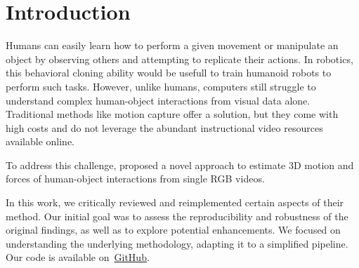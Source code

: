 \section{Introduction}
\label{sec:intro}

Humans can easily learn how to perform a given movement or manipulate an object by observing others and attempting to replicate their actions. 
In robotics, this behavioral cloning ability would be usefull to train humanoid robots to perform such tasks. 
However, unlike humans, computers still struggle to understand complex human-object interactions from visual data alone. 
Traditional methods like motion capture offer a solution, but they come with high costs and do not leverage the abundant instructional video 
resources available online.

To address this challenge, \citet{li2019estimating} proposed a novel approach to estimate 3D motion and forces of human-object interactions 
from single RGB videos. 

In this work, we critically reviewed and reimplemented certain aspects of their method. Our initial goal was to assess 
the reproducibility and robustness of the original findings, as well as to explore potential enhancements. We focused on understanding the 
underlying methodology, adapting it to a simplified pipeline. Our code is available on~\href{https://github.com/balthazarneveu/monocular_pose_and_forces_estimation}{GitHub}.



